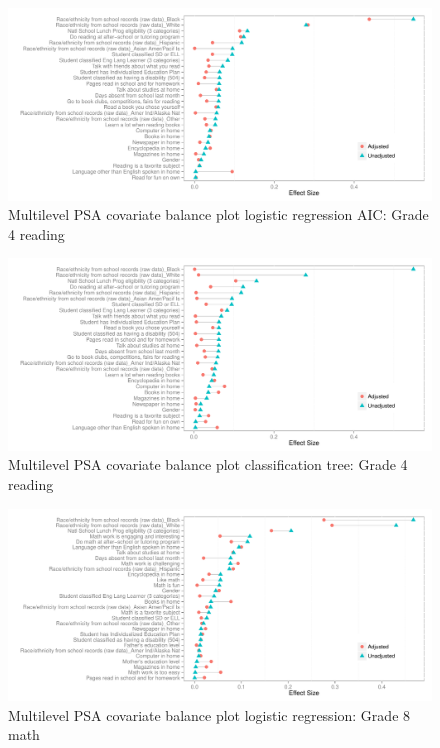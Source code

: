 \begin{figure}[h!]
\begin{center}
\includegraphics[width=\textwidth]{../Figures2009/g4read-mlpsa-lrAIC-balance.pdf}
\caption{Multilevel PSA covariate balance plot logistic regression AIC: Grade 4 reading}
\end{center}
\end{figure}

\begin{figure}[h!]
\begin{center}
\includegraphics[width=\textwidth]{../Figures2009/g4read-mlpsa-ctree-balance.pdf}
\caption{Multilevel PSA covariate balance plot classification tree: Grade 4 reading}
\end{center}
\end{figure}

\begin{figure}[h!]
\begin{center}
\includegraphics[width=\textwidth]{../Figures2009/g8math-mlpsa-lr-balance.pdf}
\caption{Multilevel PSA covariate balance plot logistic regression: Grade 8 math}
\end{center}
\end{figure}

